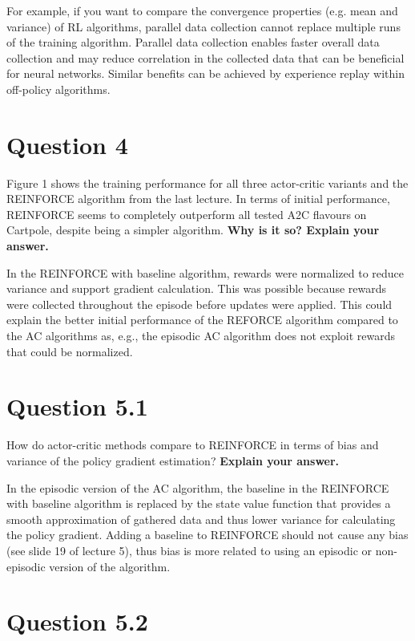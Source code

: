 \documentclass[12pt]{article}
\begin{document}
For example, if you want to compare the convergence properties (e.g. mean and variance) of RL algorithms, parallel data collection cannot replace multiple runs of the training algorithm.
Parallel data collection enables faster overall data collection and may reduce correlation in the collected data that can be beneficial for neural networks. Similar benefits can be achieved by experience replay within off-policy algorithms.



\section*{Question 4}

Figure 1 shows the training performance for all three actor-critic
variants and the REINFORCE algorithm from the last lecture. In terms of initial performance,
REINFORCE seems to completely outperform all tested A2C flavours on Cartpole, despite being
a simpler algorithm. \textbf{Why is it so? Explain your answer.}
\newline

In the REINFORCE with baseline algorithm, rewards were normalized to reduce variance and support gradient calculation. This was possible because rewards were collected throughout the episode before updates were applied. This could explain the better initial performance of the REFORCE algorithm compared to the AC algorithms as, e.g., the episodic AC algorithm does not exploit rewards that could be normalized. 


\section*{Question 5.1}

How do actor-critic methods compare to REINFORCE in terms of
bias and variance of the policy gradient estimation? \textbf{Explain your answer.}
\newline

In the episodic version of the AC algorithm, the baseline in the REINFORCE with baseline algorithm is replaced by the state value function that provides a smooth approximation of gathered data and thus lower variance for calculating the policy gradient. Adding a baseline to REINFORCE should not cause any bias (see slide 19 of lecture 5), thus bias is more related to using an episodic or non-episodic version of the algorithm.


\section*{Question 5.2}
\end{document}
